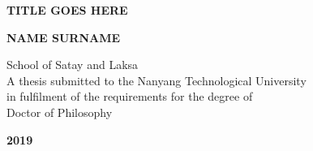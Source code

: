 \pagestyle{plain}
\thispagestyle{empty}
\begin{center}
    \vspace*{2cm}

    \Large{\Large{\textbf{TITLE GOES HERE}}}
    
    \vspace{6cm}
    
    \large{\textbf{NAME SURNAME}}
    
    \vspace{8cm}
    
    School of Satay and Laksa\\
    
    \vspace{1cm}
    A thesis submitted to the Nanyang Technological University\\
    in fulfilment of the requirements for the degree of\\
    Doctor of Philosophy\\
    
    \vspace{1cm}
    
    \Large{\textbf{2019}}
  
\end{center}

